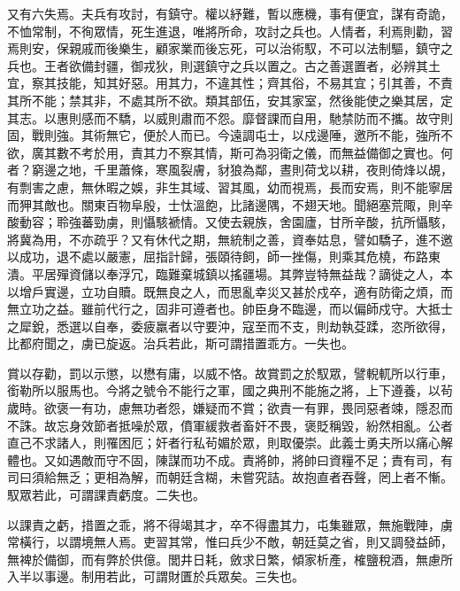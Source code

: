 \begin{pinyinscope}
 又有六失焉。夫兵有攻討，有鎮守。權以紓難，暫以應機，事有便宜，謀有奇詭，不恤常制，不徇眾情，死生進退，唯將所命，攻討之兵也。人情者，利焉則勸，習焉則安，保親戚而後樂生，顧家業而後忘死，可以治術馭，不可以法制驅，鎮守之兵也。王者欲備封疆，御戎狄，則選鎮守之兵以置之。古之善選置者，必辨其土宜，察其技能，知其好惡。用其力，不違其性；齊其俗，不易其宜；引其善，不責其所不能；禁其非，不處其所不欲。類其部伍，安其家室，然後能使之樂其居，定其志。以惠則感而不驕，以威則肅而不怨。靡督課而自用，馳禁防而不攜。故守則固，戰則強。其術無它，便於人而已。今遠調屯士，以戍邊陲，邀所不能，強所不欲，廣其數不考於用，責其力不察其情，斯可為羽衛之儀，而無益備御之實也。何者？窮邊之地，千里蕭條，寒風裂膚，豺狼為鄰，晝則荷戈以耕，夜則倚烽以覘，有剽害之慮，無休暇之娛，非生其域、習其風，幼而視焉，長而安焉，則不能寧居而狎其敵也。關東百物阜殷，士忲溫飽，比諸邊隅，不翅天地。聞絕塞荒陬，則辛酸動容；聆強蕃勁虜，則懾駭褫情。又使去親族，舍園廬，甘所辛酸，抗所懾駭，將冀為用，不亦疏乎？又有休代之期，無統制之善，資奉姑息，譬如驕子，進不邀以成功，退不處以嚴憲，屈指計歸，張頤待飼，師一挫傷，則乘其危橈，布路東潰。平居殫資儲以奉浮冗，臨難棄城鎮以搖疆場。其弊豈特無益哉？謫徙之人，本以增戶實邊，立功自贖。既無良之人，而思亂幸災又甚於戍卒，適有防衛之煩，而無立功之益。雖前代行之，固非可遵者也。帥臣身不臨邊，而以偏師戍守。大抵士之犀銳，悉選以自奉，委疲羸者以守要沖，寇至而不支，則劫執芟蹂，恣所欲得，比都府聞之，虜已旋返。治兵若此，斯可謂措置乖方。一失也。



 賞以存勸，罰以示懲，以懋有庸，以威不恪。故賞罰之於馭眾，譬輗軏所以行車，銜勒所以服馬也。今將之號令不能行之軍，國之典刑不能施之將，上下遵養，以茍歲時。欲褒一有功，慮無功者怨，嫌疑而不賞；欲責一有罪，畏同惡者竦，隱忍而不誅。故忘身效節者抵噪於眾，僨軍緩救者畜奸不畏，褒貶稱毀，紛然相亂。公者直己不求諸人，則罹困厄；奸者行私茍媚於眾，則取優崇。此義士勇夫所以痛心解體也。又如遇敵而守不固，陳謀而功不成。責將帥，將帥曰資糧不足；責有司，有司曰須給無乏；更相為解，而朝廷含糊，未嘗究詰。故抱直者吞聲，罔上者不慚。馭眾若此，可謂課責虧度。二失也。



 以課責之虧，措置之乖，將不得竭其才，卒不得盡其力，屯集雖眾，無施戰陣，虜常橫行，以謂境無人焉。吏習其常，惟曰兵少不敵，朝廷莫之省，則又調發益師，無裨於備御，而有弊於供億。閭井日耗，斂求日繁，傾家析產，榷鹽稅酒，無慮所入半以事邊。制用若此，可謂財匱於兵眾矣。三失也。




\end{pinyinscope}
